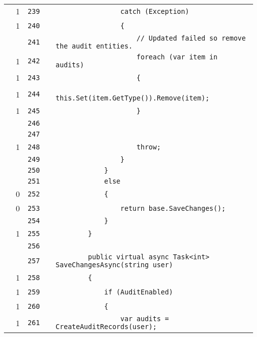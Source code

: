 \documentclass[a4paper,10pt]{article}
\begin{document}
\begin{longtable}[l]{lrrll}
\cellcolor{green} & 1 & \verb~239~ & & \verb~                catch (Exception)~\\
\cellcolor{green} & 1 & \verb~240~ & & \verb~                {~\\
\cellcolor{gray} &  & \verb~241~ & & \verb~                    // Updated failed so remove the audit entities.~\\
\cellcolor{green} & 1 & \verb~242~ & & \verb~                    foreach (var item in audits)~\\
\cellcolor{green} & 1 & \verb~243~ & & \verb~                    {~\\
\cellcolor{green} & 1 & \verb~244~ & & \verb~                        this.Set(item.GetType()).Remove(item);~\\
\cellcolor{green} & 1 & \verb~245~ & & \verb~                    }~\\
\cellcolor{gray} &  & \verb~246~ & & \verb~~\\
\cellcolor{gray} &  & \verb~247~ & & \verb~~\\
\cellcolor{green} & 1 & \verb~248~ & & \verb~                    throw;~\\
\cellcolor{gray} &  & \verb~249~ & & \verb~                }~\\
\cellcolor{gray} &  & \verb~250~ & & \verb~            }~\\
\cellcolor{gray} &  & \verb~251~ & & \verb~            else~\\
\cellcolor{red} & 0 & \verb~252~ & & \verb~            {~\\
\cellcolor{red} & 0 & \verb~253~ & & \verb~                return base.SaveChanges();~\\
\cellcolor{gray} &  & \verb~254~ & & \verb~            }~\\
\cellcolor{green} & 1 & \verb~255~ & & \verb~        }~\\
\cellcolor{gray} &  & \verb~256~ & & \verb~~\\
\cellcolor{gray} &  & \verb~257~ & & \verb~        public virtual async Task<int> SaveChangesAsync(string user)~\\
\cellcolor{green} & 1 & \verb~258~ & & \verb~        {~\\
\cellcolor{green} & 1 & \verb~259~ & & \verb~            if (AuditEnabled)~\\
\cellcolor{green} & 1 & \verb~260~ & & \verb~            {~\\
\cellcolor{green} & 1 & \verb~261~ & & \verb~                var audits = CreateAuditRecords(user);~\\

\end{longtable}
\end{document}
